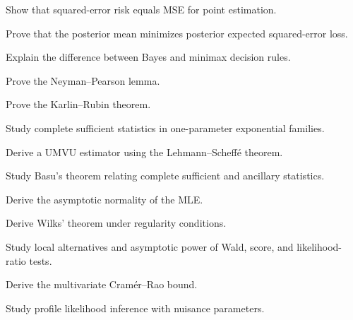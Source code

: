 \begin{exercise}[3]
Show that squared-error risk equals MSE for point estimation.
\end{exercise}

\begin{exercise}[3]
Prove that the posterior mean minimizes posterior expected squared-error
loss.
\end{exercise}

\begin{exercise}[3]
Explain the difference between Bayes and minimax decision rules.
\end{exercise}

\begin{exercise}[4]
Prove the Neyman--Pearson lemma.
\end{exercise}

\begin{exercise}[4]
Prove the Karlin--Rubin theorem.
\end{exercise}

\begin{exercise}[4]
Study complete sufficient statistics in one-parameter exponential
families.
\end{exercise}

\begin{exercise}[4]
Derive a UMVU estimator using the Lehmann--Scheffé theorem.
\end{exercise}

\begin{exercise}[4]
Study Basu's theorem relating complete sufficient and ancillary
statistics.
\end{exercise}

\begin{exercise}[4]
Derive the asymptotic normality of the MLE.
\end{exercise}

\begin{exercise}[4]
Derive Wilks' theorem under regularity conditions.
\end{exercise}

\begin{exercise}[4]
Study local alternatives and asymptotic power of Wald, score, and
likelihood-ratio tests.
\end{exercise}

\begin{exercise}[4]
Derive the multivariate Cramér--Rao bound.
\end{exercise}

\begin{exercise}[4]
Study profile likelihood inference with nuisance parameters.
\end{exercise}

